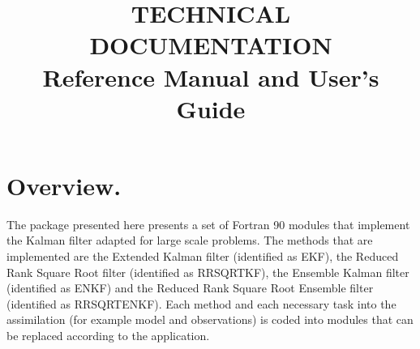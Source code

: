 \documentclass[12pt]{article}
\title{TECHNICAL DOCUMENTATION \\ \vskip 1cm Reference Manual and User's Guide}
\author{}
\date{}
\begin{document}
\maketitle

\tableofcontents

\pagebreak

\section{Overview.}
The package presented here presents a set of Fortran 90 modules that implement the Kalman filter adapted for large scale problems. The methods that are implemented are the Extended Kalman filter (identified as EKF), the Reduced Rank Square Root filter (identified as RRSQRTKF), the Ensemble Kalman filter (identified as ENKF) and the Reduced Rank Square Root Ensemble filter (identified as RRSQRTENKF). Each method and each necessary task into the assimilation (for example model and observations) is coded into modules that can be replaced according to the application. 
\end{document}
